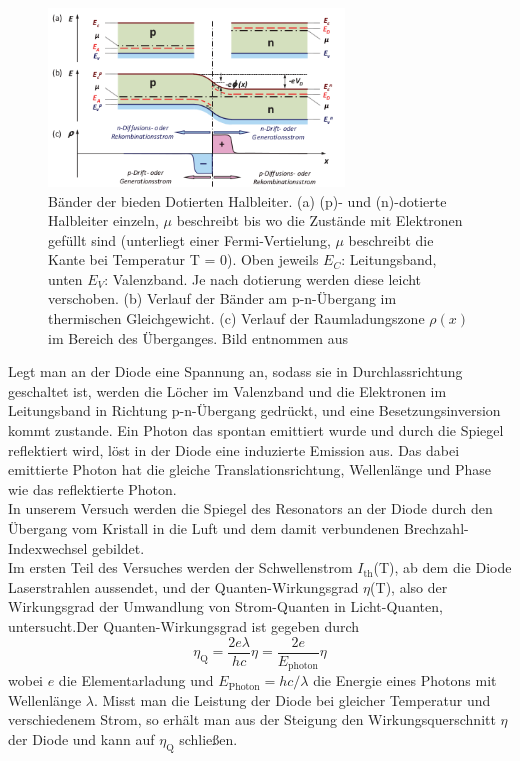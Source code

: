 \documentclass[a4paper,10pt]{scrartcl} %
\begin{document}
\begin{figure}
\centering
\includegraphics[width=0.7\textwidth]{Bilder/Halbleiter_2.png}
\caption{Bänder der bieden Dotierten Halbleiter. (a) (p)- und (n)-dotierte Halbleiter einzeln, $\mu$ beschreibt bis wo die Zustände mit Elektronen gefüllt sind (unterliegt einer Fermi-Vertielung, $\mu$ beschreibt die Kante bei Temperatur T = 0). Oben jeweils $E_C$: Leitungsband, unten $E_V$: Valenzband. Je nach dotierung werden diese leicht verschoben. (b) Verlauf der Bänder am p-n-Übergang im thermischen Gleichgewicht. (c) Verlauf der Raumladungszone $\rho (x)$ im Bereich des Überganges. Bild entnommen aus \cite{Marx}
}
\label{fig:Halbleiter}
\end{figure}
Legt man an der Diode eine Spannung an, sodass sie in Durchlassrichtung geschaltet ist, werden die Löcher im Valenzband und die Elektronen im Leitungsband in Richtung p-n-Übergang gedrückt, und eine Besetzungsinversion kommt zustande. Ein Photon das spontan emittiert wurde und durch die Spiegel reflektiert wird, löst in der Diode eine induzierte Emission aus. Das dabei emittierte Photon hat die gleiche Translationsrichtung, Wellenlänge und Phase wie das reflektierte Photon.\\
In unserem Versuch werden die Spiegel des Resonators an der Diode durch den Übergang vom Kristall in die Luft und dem damit verbundenen Brechzahl-Indexwechsel gebildet.\\
Im ersten Teil des Versuches werden der Schwellenstrom $I_{\text{th}}$(T), ab dem die Diode Laserstrahlen aussendet, und der Quanten-Wirkungsgrad $\eta$(T), also der Wirkungsgrad der Umwandlung von Strom-Quanten in Licht-Quanten, untersucht.Der Quanten-Wirkungsgrad ist gegeben durch
\begin{equation}
\label{eqn:Quanten_Winrkungsgrad}
\eta_{\text{Q}} = \frac{2e\lambda}{hc}\eta = \frac{2e}{E_{\text{photon}}}\eta
\end{equation}
wobei $e$ die Elementarladung und $E_{\text{Photon}} = hc/\lambda$ die Energie eines Photons mit Wellenlänge $\lambda$. Misst man die Leistung der Diode bei gleicher Temperatur und verschiedenem Strom, so erhält man aus der Steigung den Wirkungsquerschnitt $\eta$ der Diode und kann auf $\eta_{\text{Q}}$ schlie\ss en.
\end{document}
